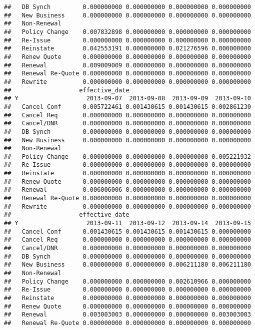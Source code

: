 \documentclass[]{article}
\begin{document}
\begin{verbatim}
##   DB Synch         0.000000000 0.000000000 0.000000000 0.000000000
##   New Business     0.000000000 0.000000000 0.000000000 0.000000000
##   Non-Renewal                                                     
##   Policy Change    0.007832898 0.000000000 0.000000000 0.000000000
##   Re-Issue         0.000000000 0.000000000 0.000000000 0.000000000
##   Reinstate        0.042553191 0.000000000 0.021276596 0.000000000
##   Renew Quote      0.000000000 0.000000000 0.000000000 0.000000000
##   Renewal          0.009009009 0.000000000 0.000000000 0.000000000
##   Renewal Re-Quote 0.000000000 0.000000000 0.000000000 0.000000000
##   Rewrite          0.000000000 0.000000000 0.000000000 0.000000000
##                   effective_date
## Y                   2013-09-07  2013-09-08  2013-09-09  2013-09-10
##   Cancel Conf      0.005722461 0.001430615 0.001430615 0.002861230
##   Cancel Req       0.000000000 0.000000000 0.000000000 0.000000000
##   Cancel/DNR       0.000000000 0.000000000 0.000000000 0.000000000
##   DB Synch         0.000000000 0.000000000 0.000000000 0.000000000
##   New Business     0.000000000 0.000000000 0.000000000 0.000000000
##   Non-Renewal                                                     
##   Policy Change    0.000000000 0.000000000 0.000000000 0.005221932
##   Re-Issue         0.000000000 0.000000000 0.000000000 0.000000000
##   Reinstate        0.000000000 0.000000000 0.000000000 0.000000000
##   Renew Quote      0.000000000 0.000000000 0.000000000 0.000000000
##   Renewal          0.006006006 0.000000000 0.000000000 0.000000000
##   Renewal Re-Quote 0.000000000 0.000000000 0.000000000 0.000000000
##   Rewrite          0.000000000 0.000000000 0.000000000 0.000000000
##                   effective_date
## Y                   2013-09-11  2013-09-12  2013-09-14  2013-09-15
##   Cancel Conf      0.001430615 0.001430615 0.001430615 0.000000000
##   Cancel Req       0.000000000 0.000000000 0.000000000 0.000000000
##   Cancel/DNR       0.000000000 0.000000000 0.000000000 0.000000000
##   DB Synch         0.000000000 0.000000000 0.000000000 0.000000000
##   New Business     0.000000000 0.000000000 0.006211180 0.006211180
##   Non-Renewal                                                     
##   Policy Change    0.000000000 0.000000000 0.002610966 0.000000000
##   Re-Issue         0.000000000 0.000000000 0.000000000 0.000000000
##   Reinstate        0.000000000 0.000000000 0.000000000 0.000000000
##   Renew Quote      0.000000000 0.000000000 0.000000000 0.000000000
##   Renewal          0.003003003 0.000000000 0.000000000 0.003003003
##   Renewal Re-Quote 0.000000000 0.000000000 0.000000000 0.000000000

\end{verbatim}
\end{document}
